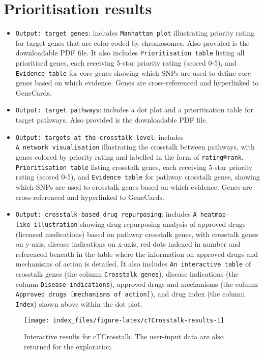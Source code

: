 \documentclass[
  oneside]{book}
\begin{document}
\hypertarget{prioritisation-results-1}{%
\section{Prioritisation results}\label{prioritisation-results-1}}

\begin{itemize}
\item
  \texttt{Output:\ target\ genes}: includes \texttt{Manhattan\ plot} illustrating priority rating for target genes that are color-coded by chromosomes. Also provided is the downloadable PDF file. It also includes \texttt{Prioritisation\ table} listing all prioritised genes, each receiving 5-star priority rating (scored 0-5), and \texttt{Evidence\ table} for core genes showing which SNPs are used to define core genes based on which evidence. Genes are cross-referenced and hyperlinked to GeneCards.
\item
  \texttt{Output:\ target\ pathways}: includes a dot plot and a prioritisation table for target pathways. Also provided is the downloadable PDF file.
\item
  \texttt{Output:\ targets\ at\ the\ crosstalk\ level}: includes \texttt{A\ network\ visualisation} illustrating the crosstalk between pathways, with genes colored by priority rating and labelled in the form of \texttt{rating®rank}, \texttt{Prioritisation\ table}
  listing crosstalk genes, each receiving 5-star priority rating (scored 0-5), and \texttt{Evidence\ table} for pathway crosstalk genes, showing which SNPs are used to crosstalk genes based on which evidence. Genes are cross-referenced and hyperlinked to GeneCards.
\item
  \texttt{Output:\ crosstalk-based\ drug\ repurposing}: includes \texttt{A\ heatmap-like\ illustration} showing drug repurposing analysis of approved drugs (licensed medications) based on pathway crosstalk genes, with crosstalk genes on y-axis, disease indications on x-axis, red dots indexed in number and referenced beneath in the table where the information on approved drugs and mechanisms of action is detailed. It also includes \texttt{An\ interactive\ table} of crosstalk genes (the column \texttt{Crosstalk\ genes}), disease indications (the column \texttt{Disease\ indications}), approved drugs and mechanisms (the column \texttt{Approved\ drugs\ {[}mechanisms\ of\ action{]}}), and drug index (the column \texttt{Index}) shown above within the dot plot.
\end{itemize}

\begin{figure}

{\centering \texttt{[image: index\_files/figure-latex/cTCrosstalk-results-1]} 

}

\caption{Interactive results for cTCrosstalk. The user-input data are also returned for the exploration.}\label{fig:cTCrosstalk-results}
\end{figure}
\end{document}
